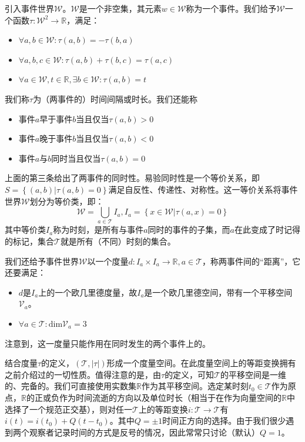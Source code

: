 \documentclass[main.tex]{subfiles}
\begin{document}
引入事件世界$\mathcal{W}$。$\mathcal{W}$是一个非空集，其元素$w\in\mathcal{W}$称为一个事件。我们给予$\mathcal{W}$一个函数$\tau:\mathcal{W}^2\rightarrow\mathbb{R}$，满足：
\begin{itemize}
    \item $\forall a,b\in\mathcal{W}:\tau\left(a,b\right)=-\tau\left(b,a\right)$
    \item $\forall a,b,c\in\mathcal{W}:\tau\left(a,b\right)+\tau\left(b,c\right)=\tau\left(a,c\right)$
    \item $\forall a\in\mathcal{W},t\in\mathbb{R},\exists b\in\mathcal{W}:\tau\left(a,b\right)=t$
\end{itemize}
我们称$\tau$为（两事件的）时间间隔或时长。我们还能称
\begin{itemize}
    \item 事件$a$早于事件$b$当且仅当$\tau\left(a,b\right)>0$
    \item 事件$a$晚于事件$b$当且仅当$\tau\left(a,b\right)<0$
    \item 事件$a$与$b$同时当且仅当$\tau\left(a,b\right)=0$
\end{itemize}
上面的第三条给出了两事件的同时性。易验同时性是一个等价关系，即$S=\left\{\left(a,b\right)|\tau\left(a,b\right)=0\right\}$满足自反性、传递性、对称性。这一等价关系将事件世界$\mathcal{W}$划分为等价类，即：
\[\mathcal{W}=\bigcup_{a\in\mathcal{T}}I_a,I_a=\left\{x\in\mathcal{W}|\tau\left(a,x\right)=0\right\}\]
其中等价类$I_a$称为时刻，是所有与事件$a$同时的事件的子集，而$a$在此变成了时记得的标记，集合$\mathcal{T}$就是所有（不同）时刻的集合。

我们还给予事件世界$\mathcal{W}$以一个度量$d:I_a\times I_a\rightarrow\mathbb{R},a\in\mathcal{T}$，称两事件间的“距离”，它还要满足：
\begin{itemize}
    \item $d$是$I_a$上的一个欧几里德度量，故$I_a$是一个欧几里德空间，带有一个平移空间$\mathcal{V}_a$。
    \item $\forall a\in\mathcal{T}:\mathrm{dim}\mathcal{V}_a=3$
\end{itemize}
注意到，这一度量只能作用在同时发生的两个事件上的。

结合度量$\tau$的定义，$\left(\mathcal{T},\left|\tau\right|\right)$形成一个度量空间。在此度量空间上的等距变换拥有之前介绍过的一切性质。值得注意的是，由$\tau$的定义，可知$\mathcal{T}$的平移空间是一维的、完备的。我们可直接使用实数集$\mathbb{R}$作为其平移空间。选定某时刻$t_0\in\mathcal{T}$作为原点，$\mathbb{R}$的正或负作为时间流逝的方向以及单位时长（相当于在作为向量空间的$\mathbb{R}$中选择了一个规范正交基），则对任一$\mathcal{T}$上的等距变换$i:\mathcal{T}\rightarrow\mathcal{T}$有$i\left(t\right)=i\left(t_0\right)+ Q\left(t-t_0\right)$。其中$Q=\pm 1$时间正方向的选择。由于我们很少遇到两个观察者记录时间的方式是反号的情况，因此常常只讨论（默认）$Q=1$。
\end{document}
